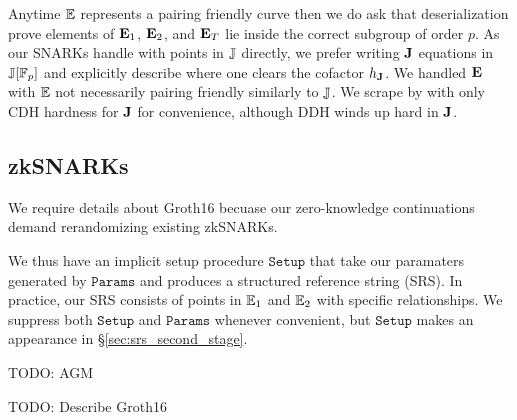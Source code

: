 Anytime ${\mathbb{E}}$ represents a pairing friendly curve then we do ask that deserialization prove elements of ${\mathbf{E}}_1$, ${\mathbf{E}}_2$, and ${\mathbf{E}}_T$ lie inside the correct subgroup of order $p$.  As our SNARKs handle with points in ${\mathbb{J}}$ directly, we prefer writing ${\mathbf{J}}$ equations in ${\mathbb{J}}[\mathbb{F}_p]$ and explicitly describe where one clears the cofactor $h_{{\mathbf{J}}}$.  We handled ${\mathbf{E}}$ with ${\mathbb{E}}$ not necessarily pairing friendly similarly to ${\mathbb{J}}$.  We scrape by with only CDH hardness for ${\mathbf{J}}$ for convenience, although DDH winds up hard in ${\mathbf{J}}$.



\subsection{zkSNARKs}

We require details about Groth16 \cite{groth16} becuase our zero-knowledge continuations demand rerandomizing existing zkSNARKs. %

We thus have an implicit setup procedure $\mathtt{Setup}$ that take our paramaters generated by $\mathtt{Params}$ and produces a structured reference string (SRS).  In practice, our SRS consists of points in ${\mathbb{E}}_1$ and ${\mathbb{E}}_2$ with specific relationships.  We suppress both $\mathtt{Setup}$ and $\mathtt{Params}$ whenever convenient, but $\mathtt{Setup}$ makes an appearance in \S\ref{sec:srs_second_stage}.

TODO: AGM

TODO: Describe Groth16 \cite{groth16} 

































\endinput



BROKEN BOLOW THIS




We fix $J \in \ecJ$ as a generator for public keys.  Any $\KeyGen$ algorithm randomly samples a secret keys $\sk \in \F_q$ and then computes its associate public keys $\pk = \sk J$.  We shall not discuss infrastructure that authorizes public keys.  Yet although our results do not require proof-of-knowledge on $\pk$ per se, we still strongly recommend that back certifications accompany any certificates that authorize $\pk$.

\smallskip




